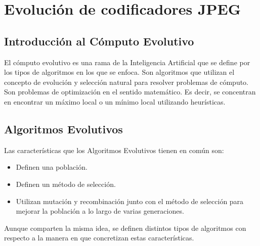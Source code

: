 
\chapter{Evolución de codificadores JPEG}\label{ch:evolucion}

\section{Introducción al Cómputo Evolutivo}

El \gls{cómputo evolutivo} es una rama de la Inteligencia Artificial que se define
por los tipos de algoritmos en los que se enfoca. Son algoritmos que utilizan
el concepto de evolución y selección natural para resolver problemas de cómputo. Son
problemas de optimización en el sentido matemático. Es decir, se concentran en
encontrar un máximo local o un mínimo local utilizando heurísticas.

\section{Algoritmos Evolutivos}

Las características que los Algoritmos Evolutivos tienen en común son:

\begin{itemize}
   \item Definen una población.
   \item Definen un método de selección.
   \item Utilizan mutación y recombinación junto con el método de selección para
      mejorar la población a lo largo de varias generaciones.
\end{itemize}

Aunque comparten la misma idea, se definen distintos tipos de algoritmos con
respecto a la manera en que concretizan estas características.

